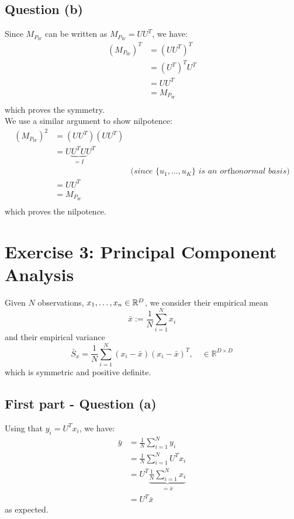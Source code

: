 \documentclass[12pt]{article}
\begin{document}
\subsection{Question (b)}
Since \(M_{P_W}\) can be written as \(M_{P_W} = UU^T\), we have:
\begin{align*}
    \left( M_{P_W} \right)^T
     & = \left( UU^T \right)^T    \\
     & = \left( U^T \right)^T U^T \\
     & = UU^T                     \\
     & = M_{P_W}                  \\
\end{align*}
which proves the symmetry.\\
We use a similar argument to show nilpotence:
\begin{align*}
    \left( M_{P_W} \right)^2
     & = \left( UU^T \right)\left( UU^T \right)                                                                            \\
     & = U \underbrace{U^TU}_{=I} U^T                                                                                      \\
     &                                          & \textit{(since } \{u_1, \ldots, u_K\} \textit{ is an orthonormal basis}) \\
     & = UU^T                                                                                                              \\
     & = M_{P_W}                                                                                                           \\
\end{align*}
which proves the nilpotence.

\section{Exercise 3: Principal Component Analysis}
Given \(N\) observations, \(x_1, \ldots, x_n \in \mathbb{R}^D\), we consider their empirical mean
\[
    \bar x := \frac{1}{N} \sum_{i=1}^{N} x_i
\]
and their empirical variance
\[
    \bar{S}_{x} = \frac{1}{N} \sum_{i=1}^{N}\left(x_{i}-\bar{x}\right)\left(x_{i}-\bar{x}\right)^{T}, \quad \in \mathbb{R}^{D \times D}
\]
which is symmetric and positive definite.

\subsection{First part - Question (a)}
Using that \(y_i = U^T x_i\), we have:
\begin{align*}
    \bar y
     & = \frac{1}{N} \sum_{i=1}^{N} y_i                              \\
     & = \frac{1}{N} \sum_{i=1}^{N} U^T x_i                          \\
     & = U^T \underbrace{\frac{1}{N} \sum_{i=1}^{N} x_i}_{{=\bar x}} \\
     & = U^T \bar x
\end{align*}
as expected.
\end{document}
